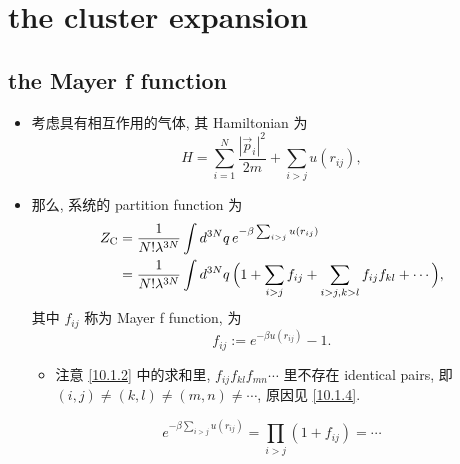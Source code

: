\chapter{the cluster expansion}
\section{the Mayer f function}
\begin{itemize}
	\item 考虑具有相互作用的气体, 其 Hamiltonian 为
	\begin{equation}
		H = \sum_{i = 1}^N \frac{|\vec{p}_i|^2}{2 m} + \sum_{i > j} u(r_{i j}),
	\end{equation}
	
	\item 那么, 系统的 partition function 为
	\begin{align}
		Z_\text{C} &= \frac{1}{N! \lambda^{3 N}} \int d^{3 N} q \, e^{- \beta \sum_{i > j} u(r_{i j})} \notag \\
		&= \frac{1}{N! \lambda^{3 N}} \int d^{3 N} q \, \Big( 1 + \sum_{i > j} f_{i j} + \sum_{i > j, k > l} f_{i j} f_{k l} + \cdots \Big), \label{10.1.2}
	\end{align}
	其中 $f_{i j}$ 称为 Mayer f function, 为
	\begin{equation}
		f_{i j} := e^{- \beta u(r_{i j})} - 1.
	\end{equation}
	\begin{itemize}
		\item 注意 \eqref{10.1.2} 中的求和里, $f_{i j} f_{k l} f_{m n} \cdots$ 里不存在 identical pairs, 即 $(i, j) \neq (k, l) \neq (m, n) \neq \cdots$, 原因见 \eqref{10.1.4}.
	\end{itemize}
	
	\begin{tcolorbox}[title=proof:]
		\begin{equation} \label{10.1.4}
			e^{- \beta \sum_{i > j} u(r_{i j})} = \prod_{i > j} (1 + f_{i j}) = \cdots
		\end{equation}
	\end{tcolorbox}
\end{itemize}

